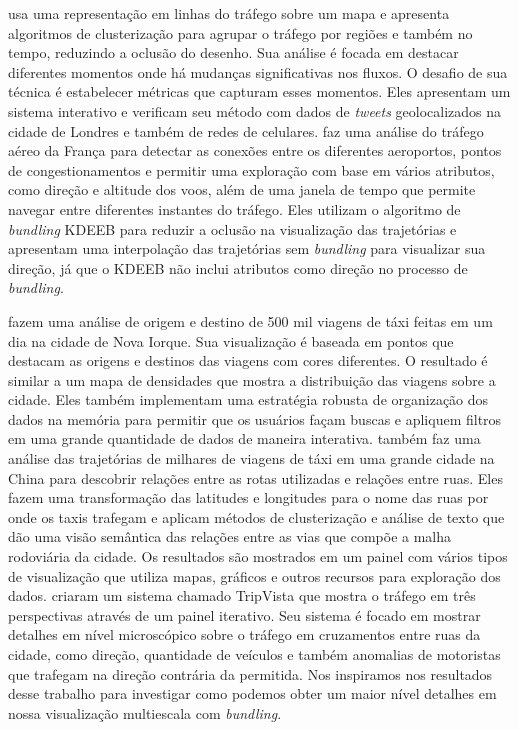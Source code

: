  \citet{Landersberg2016} usa uma representação em linhas do tráfego sobre um
mapa e apresenta algoritmos de clusterização para agrupar o tráfego por regiões
e também no tempo, reduzindo a oclusão do desenho. Sua análise é focada em destacar diferentes momentos onde há
mudanças significativas nos fluxos. O desafio de sua técnica é estabelecer métricas
que capturam esses momentos.  Eles apresentam um sistema interativo e
verificam seu método com dados de \emph{tweets} geolocalizados na cidade de Londres e
também de redes de celulares. \citet{Klein2014} faz uma análise do tráfego aéreo
da França para detectar as conexões entre os diferentes aeroportos, pontos de
congestionamentos e permitir uma exploração com base em vários atributos, como
direção e altitude dos voos, além de uma janela de tempo que permite navegar
entre diferentes instantes do tráfego. Eles utilizam o algoritmo de
\emph{bundling} KDEEB para reduzir a oclusão na visualização das trajetórias
e apresentam uma interpolação das trajetórias sem \emph{bundling} para visualizar
sua direção, já que o KDEEB não inclui atributos como direção no processo de \emph{bundling}.

\citet{Ferreira2013} fazem uma análise de origem e destino de 500 mil viagens
de táxi feitas em um dia na cidade de Nova Iorque. Sua visualização é baseada
em pontos que destacam as origens e destinos das viagens com cores diferentes.
O resultado é similar a um mapa de densidades que mostra a distribuição das
viagens sobre a cidade. Eles também implementam uma estratégia robusta de
organização dos dados na memória para permitir que os usuários façam buscas e
apliquem filtros em uma grande quantidade de dados de maneira interativa.
\citet{Chu2014} também faz uma análise das trajetórias de milhares de viagens
de táxi em uma grande cidade na China para descobrir relações entre as rotas
utilizadas e relações entre ruas. Eles fazem uma transformação das latitudes e
longitudes para o nome das ruas por onde os taxis trafegam e aplicam métodos de
clusterização e análise de texto que dão uma visão semântica das relações entre
as vias que compõe a malha rodoviária da cidade. Os resultados são mostrados em
um painel com vários tipos de visualização que utiliza mapas, gráficos e outros
recursos para exploração dos dados. \citet{Guo2011} criaram um sistema chamado
TripVista que mostra o tráfego em três perspectivas através de um painel
iterativo.  Seu sistema é focado em mostrar detalhes em nível microscópico
sobre o tráfego em cruzamentos entre ruas da cidade, como direção, quantidade
de veículos e também anomalias de motoristas que trafegam na direção contrária
da permitida. Nos inspiramos nos resultados desse trabalho para investigar como
podemos obter um maior nível detalhes em nossa visualização multiescala com
\emph{bundling}.

